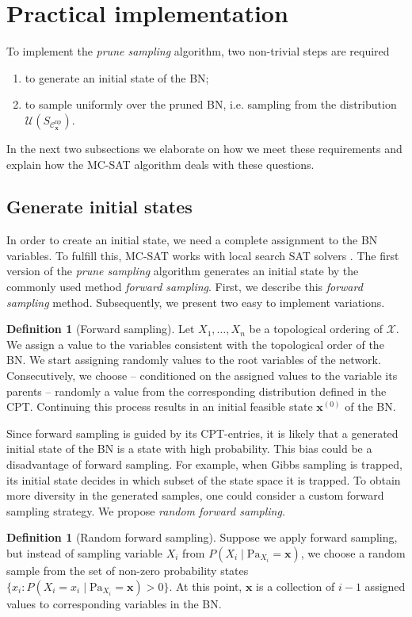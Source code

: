 \documentclass[a4paper, twoside, 11pt]{report}
\newcommand{\bfx}{{\mathbf{x}}}
\newcommand{\C}{{\mathcal C}}
\newcommand{\U}{{\mathcal{U}}}
\theoremstyle{plain}
\theoremstyle{definition}
\newtheorem{definition}[thm]{Definition}
\theoremstyle{remark}
\newcommand{\X}{{\mathcal{X}}}
\newcommand{\ps}{\textit{prune sampling }}
\begin{document}
\section{Practical implementation}
To implement the \ps algorithm, two non-trivial steps are required
\begin{enumerate}
\item to generate an initial state of the BN;
\item to sample uniformly over the pruned BN, i.e. sampling from the distribution $\U(S_{\C_\bfx^{\text{np}}})$.
\end{enumerate}
In the next two subsections we elaborate on how we meet these requirements and explain how the MC-SAT algorithm deals with these questions.

\subsection{Generate initial states}
In order to create an initial state, we need a complete assignment to the BN variables. To fulfill this, MC-SAT works with local search SAT solvers \cite{poon2006sound}. The first version of the \ps algorithm generates an initial state by the commonly used method \textit{forward sampling}. First, we describe this \textit{forward sampling} method. Subsequently, we present two easy to implement variations.
\begin{definition}[Forward sampling]
Let $X_1, \ldots , X_n$ be a topological ordering of $\X$. We assign a value to the variables consistent with the topological order of the BN. We start assigning randomly values to the root variables of the network. Consecutively, we choose -- conditioned on the assigned values to the variable its parents -- randomly a value from the corresponding distribution defined in the CPT. Continuing this process results in an initial feasible state $\bfx^{(0)}$ of the BN.
\end{definition}
Since forward sampling is guided by its CPT-entries, it is likely that a generated initial state of the BN is a state with high probability. This bias could be a disadvantage of forward sampling. For example, when Gibbs sampling is trapped, its initial state decides in which subset of the state space it is trapped. To obtain more diversity in the generated samples, one could consider a custom forward sampling strategy. We propose \textit{random forward sampling}.
\begin{definition}[Random forward sampling]\label{def:rfs}
Suppose we apply forward sampling, but instead of sampling variable $X_i$ from $P(X_i \mid \text{Pa}_{X_i} = \mathbf{x})$, we choose a random sample from the set of non-zero probability states $\{x_i : P(X_i = x_i \mid \text{Pa}_{X_i}=\mathbf{x}) > 0\}$. At this point, $\bfx$ is a collection of $i-1$ assigned values to corresponding variables in the BN. 
\end{definition}
\end{document}
